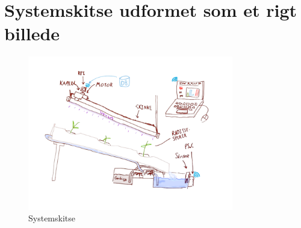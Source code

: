 \section{Systemskitse udformet som et rigt billede}

\begin{figure}[h]
    \centering
    \includegraphics[width=0.8\textwidth]{images/Systemskitse.png}
    \caption{Systemskitse}
    \label{fig:Systemskitse}
\end{figure}